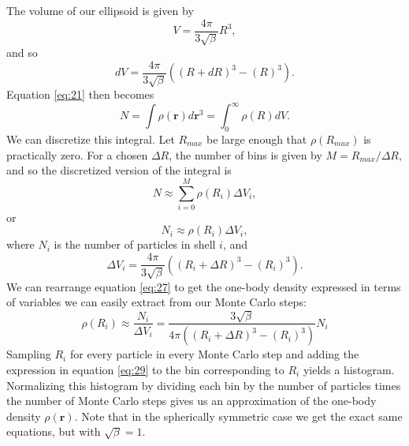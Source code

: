 \documentclass[
    a4paper, aps, twocolumn, floatfix, superscriptaddress,
    nofootinbib]{revtex4-1}
\begin{document}
\begin{figure}[H]
\makebox[0.5\textwidth][c]{}%
 \caption{}
 \label{fig:1}
\end{figure}
The volume of our ellipsoid is given by 
\begin{equation}\label{eq:ellipsoid_volume}
    V = \frac{4\pi}{3\sqrt{\beta}} R^3,
\end{equation}
and so 
\begin{equation}
    dV =\frac{4\pi}{3\sqrt{\beta}}\left((R+dR)^3-(R)^3 \right).
\end{equation}
Equation \eqref{eq:21} then becomes
\begin{equation}\label{eq:onebody_density_integral}
   N= \int \rho(\boldsymbol{r}) d\boldsymbol{r}^3 = \int_0^{\infty} \rho(R) dV. 
\end{equation}
We can discretize this integral. Let $R_{max}$ be large enough that $\rho(R_{max})$ is practically zero. For a chosen $\Delta R$, the number of bins is given by $M = R_{max}/\Delta R$, and so the discretized version of the integral is
\begin{equation}
    N \approx \sum_{i=0}^{M} \rho(R_i)  \Delta V_i,
\end{equation}
or 
\begin{equation}\label{eq:27}
    N_i \approx\rho(R_i) \Delta V_i,
\end{equation}
where $N_i$ is the number of particles in shell $i$, and 
\begin{equation}
    \Delta V_i =\frac{4\pi}{3\sqrt{\beta}}\left((R_i+\Delta R)^3-(R_i)^3 \right).
\end{equation}
We can rearrange equation \eqref{eq:27} to get the one-body density expressed in terms of variables we can easily extract from our Monte Carlo steps: 
\begin{equation}\label{eq:29}
   \rho(R_i)   \approx \frac{N_i}{\Delta V_i} = \frac{3\sqrt{\beta}}{4 \pi \left((R_i+\Delta R)^3-(R_i)^3 \right)} N_i
\end{equation}
Sampling $R_i$ for every particle in every Monte Carlo step and adding the expression in equation \eqref{eq:29} to the bin corresponding to $R_i$ yields a histogram. Normalizing this histogram by dividing each bin by the number of particles times the number of Monte Carlo steps gives us an  approximation of the one-body density $\rho(\boldsymbol{r})$. Note that in the spherically symmetric case we get the exact same equations, but with $\sqrt{\beta} = 1$.
\end{document}
